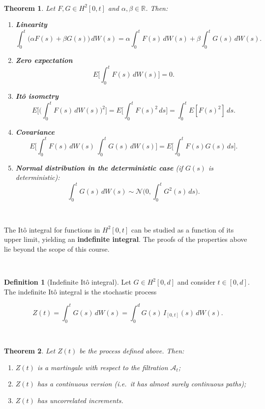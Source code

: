 \documentclass[
  11pt,
  a4paper,
]{book}
\newtheorem{theorem}{Theorem}[chapter]
\theoremstyle{definition}
\newtheorem{definition}{Definition}[chapter]
\theoremstyle{definition}
\theoremstyle{definition}
\theoremstyle{definition}
\theoremstyle{remark}
\begin{document}
\(\,\)

\begin{theorem}

Let \(F,G\in H^2[0,t]\) and \(\alpha,\beta\in\mathbb{R}\). Then:

\begin{enumerate}
\def\labelenumi{\arabic{enumi}.}
\item
  \textbf{Linearity}
  \[
  \int_0^t \big(\alpha F(s) + \beta G(s)\big)\,dW(s)
  =
  \alpha\int_0^t F(s)\,dW(s) + \beta\int_0^t G(s)\,dW(s).
  \]
\item
  \textbf{Zero expectation}
  \[
  E\Big[\int_0^t F(s)\,dW(s)\Big] = 0.
  \]
\item
  \textbf{Itô isometry}
  \[
  E\Big[\big(\int_0^t F(s)\,dW(s)\big)^2\Big] = E\Big[\int_0^t F(s)^2\,ds\Big] = \int_0^t E[F(s)^2]\,ds.
  \]
\item
  \textbf{Covariance}
  \[
  E\Big[\int_0^t F(s)\,dW(s)\ \int_0^t G(s)\,dW(s)\Big]
  = E\Big[\int_0^t F(s)G(s)\,ds\Big].
  \]
\item
  \textbf{Normal distribution in the deterministic case} (if \(G(s)\) is deterministic):
  \[
  \int_0^t G(s)\,dW(s) \sim \mathcal{N}\Big(0,\int_0^t G^2(s)\,ds\Big).
  \]
\end{enumerate}

\end{theorem}

\(\,\)

The Itô integral for functions in \(H^2[0,t]\) can be studied as a function of its upper limit, yielding an \textbf{indefinite integral}. The proofs of the properties above lie beyond the scope of this course.

\(\,\)

\begin{definition}[Indefinite Itô integral]
Let \(G\in H^2[0,d]\) and consider \(t\in[0,d]\). The indefinite Itô integral is the stochastic process

\[
Z(t) = \int_0^t G(s)\,dW(s) = \int_0^d G(s)\,I_{[0,t]}(s)\,dW(s).
\]
\end{definition}

\(\,\)

\begin{theorem}

Let \(Z(t)\) be the process defined above. Then:

\begin{enumerate}
\def\labelenumi{\arabic{enumi}.}
\item
  \(Z(t)\) is a martingale with respect to the filtration \(\mathcal{A}_t\);
\item
  \(Z(t)\) has a continuous version (i.e.~it has almost surely continuous paths);
\item
  \(Z(t)\) has uncorrelated increments.
\end{enumerate}

\end{theorem}
\end{document}
